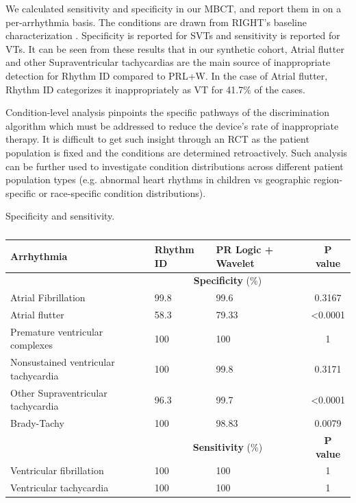 We calculated sensitivity and specificity in our MBCT, and report them in  on a per-arrhythmia basis.
The conditions are drawn from RIGHT's baseline characterization \cite{GoldABBTB11_RIGHTresults}.
Specificity is reported for SVTs and sensitivity is reported for VTs.
It can be seen from these results that in our synthetic cohort, Atrial flutter and other Supraventricular tachycardias are the main source of inappropriate detection for Rhythm ID compared to PRL+W.
In the case of Atrial flutter, Rhythm ID categorizes it inappropriately as VT for 41.7\% of the cases.

Condition-level analysis pinpoints the specific pathways of the discrimination algorithm which must be addressed to reduce the device's rate of inappropriate therapy. It is difficult to get such insight through an RCT as the patient population is fixed and the conditions are determined retroactively. Such analysis can be further used to investigate condition distributions across different patient population types (e.g. abnormal heart rhythms in children vs geographic region-specific or race-specific condition distributions).   

\begin{table}[t]
	Specificity and sensitivity.
\begin{tabular}{|p{2.8cm}|p{1.5cm}|p{1.5cm}|c|}
	\hline Arrhythmia & Rhythm ID & PR Logic + Wavelet  & P value \\ 
	\hline &	\multicolumn{2}{|c|}{\textbf{Specificity} (\%)}& \\
	\hline Atrial Fibrillation & 99.8 & 99.6 & 0.3167 \\ 
	\hline \cellcolor{blue!25} Atrial flutter & 58.3 & 79.33 & <0.0001 \\ 
	\hline Premature ventricular complexes & 100 & 100 & 1 \\ 
	\hline Nonsustained ventricular tachycardia & 100 & 99.8 & 0.3171 \\ 
	\hline \cellcolor{blue!25} Other Supraventricular tachycardia & 96.3 & 99.7 & <0.0001 \\ 
	\hline Brady-Tachy & 100 & 98.83 & 0.0079 \\ 
		\hline
	\hline &	\multicolumn{2}{|c|}{\textbf{Sensitivity} (\%)} & \textbf{P value}\\
	\hline Ventricular fibrillation & 100 & 100 & 1 \\ 
	\hline Ventricular tachycardia & 100 & 100 & 1 \\ 
	\hline 
\end{tabular} 
\caption{}
\label{tab:vtsvt}
\end{table}

